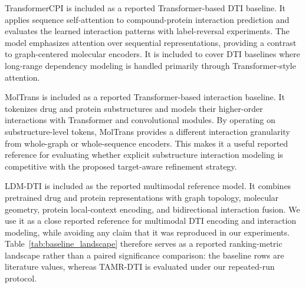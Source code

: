 TransformerCPI \citep{chen2020transformercpi} is included as a reported Transformer-based DTI baseline. It applies sequence self-attention to compound-protein interaction prediction and evaluates the learned interaction patterns with label-reversal experiments. The model emphasizes attention over sequential representations, providing a contrast to graph-centered molecular encoders. It is included to cover DTI baselines where long-range dependency modeling is handled primarily through Transformer-style attention.

MolTrans \citep{huang2021moltrans} is included as a reported Transformer-based interaction baseline. It tokenizes drug and protein substructures and models their higher-order interactions with Transformer and convolutional modules. By operating on substructure-level tokens, MolTrans provides a different interaction granularity from whole-graph or whole-sequence encoders. This makes it a useful reported reference for evaluating whether explicit substructure interaction modeling is competitive with the proposed target-aware refinement strategy.

LDM-DTI \citep{ji2026ldmdti} is included as the reported multimodal reference model. It combines pretrained drug and protein representations with graph topology, molecular geometry, protein local-context encoding, and bidirectional interaction fusion. We use it as a close reported reference for multimodal DTI encoding and interaction modeling, while avoiding any claim that it was reproduced in our experiments. Table~\ref{tab:baseline_landscape} therefore serves as a reported ranking-metric landscape rather than a paired significance comparison: the baseline rows are literature values, whereas TAMR-DTI is evaluated under our repeated-run protocol.

